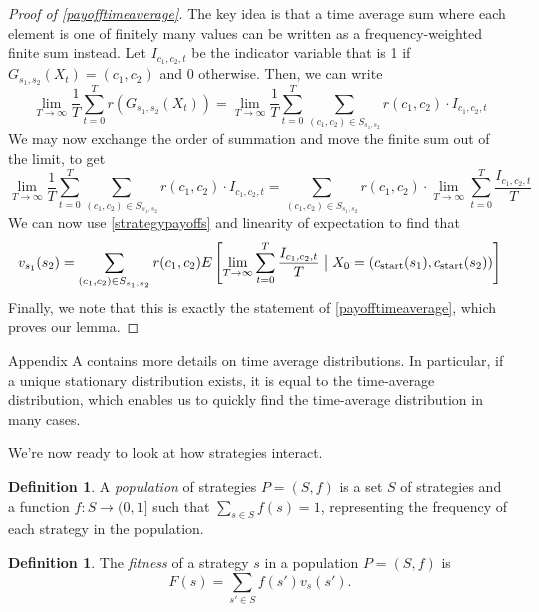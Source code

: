 \documentclass[11pt]{amsart}
\theoremstyle{definition}
\newtheorem{definition}[theorem]{Definition}
\theoremstyle{remark}
\begin{document}
\begin{proof}[Proof of \cref{payofftimeaverage}]
  The key idea is that a time average sum where each element is one of finitely many values can be written as a frequency-weighted finite sum instead. Let $I_{c_1,c_2,t}$ be the indicator variable that is 1 if $G_{s_1,s_2}(X_t) = (c_1,c_2)$ and 0 otherwise.  Then, we can write \begin{equation*}
    \lim_{T \to \infty} \frac{1}{T} \sum_{t = 0}^T r(G_{s_1,s_2}(X_t)) = 
    \lim_{T \to \infty}\frac{1}{T} \sum_{t = 0}^T \sum_{(c_1,c_2) \in S_{s_1,s_2}} r(c_1,c_2) \cdot I_{c_1,c_2,t}
  \end{equation*}
  We may now exchange the order of summation and move the finite sum out of the limit, to get \begin{equation*}
    \lim_{T \to \infty}\frac{1}{T} \sum_{t = 0}^T \sum_{(c_1,c_2) \in S_{s_1,s_2}} r(c_1,c_2) \cdot I_{c_1,c_2,t}
    = \sum_{(c_1,c_2) \in S_{s_1,s_2}} r(c_1,c_2) \cdot \lim_{T \to \infty} \sum_{t=0}^T \frac{I_{c_1,c_2,t} }{T}
  \end{equation*}
  We can now use \cref{strategypayoffs} and linearity of expectation to find that
  \begin{equation*}
    v_{s_1}(s_2) = \sum_{(c_1,c_2) \in S_{s_1,s_2}} r(c_1, c_2) E \left[ \lim_{T \to \infty} \sum_{t=0}^T \frac{I_{c_1,c_2,t}}{T} \bigm| X_0 = (c_{\text{start}}(s_1), c_{\text{start}}(s_2))
    \right]
  \end{equation*}
  Finally, we note that this is exactly the statement of \cref{payofftimeaverage}, which proves our lemma.
\end{proof}

Appendix A contains more details on time average distributions. In particular, if a unique stationary distribution exists, it is equal to the time-average distribution, which enables us to quickly find the time-average distribution in many cases.

We're now ready to look at how strategies interact.

\begin{definition}
  A \textit{population} of strategies $P = (S, f)$ is a set $S$ of strategies and a function $f : S \to (0,1]$ such that $\sum_{s \in S} f(s) = 1$, representing the frequency of each strategy in the population.
\end{definition}

\begin{definition}
  The \textit{fitness} of a strategy $s$ in a population $P = (S, f)$ is \begin{equation*}
    F(s) = \sum_{s' \in S} f(s') v_s(s').
  \end{equation*}
\end{definition}
\end{document}
